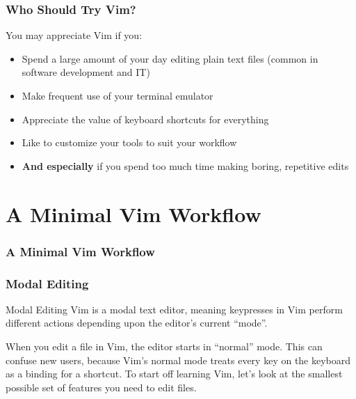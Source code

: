 \documentclass{beamer}
\begin{document}
\begin{frame}
    \frametitle{Who Should Try Vim?}
    \centerline{\large You may appreciate Vim if you:}
    \vspace{0.5cm}
    \begin{itemize}
	\item Spend a large amount of your day editing plain text files (common in software development and IT)
	\item Make frequent use of your terminal emulator
	\item Appreciate the value of keyboard shortcuts for everything
	\item Like to customize your tools to suit your workflow
	\item \textbf{And especially} if you spend too much time making boring, repetitive edits
    \end{itemize}
\end{frame}

\section{A Minimal Vim Workflow}

\begin{frame}
    \frametitle{A Minimal Vim Workflow}
    \tableofcontents[currentsection]
\end{frame}

\begin{frame}[fragile]
    \frametitle{Modal Editing}
    \small
    \begin{block}{Modal Editing}
	Vim is a modal text editor, meaning keypresses in Vim perform different actions depending upon the editor's current \enquote{mode}.\\
    \end{block}
    When you edit a file in Vim, the editor starts in \enquote{normal} mode. This can confuse new users, because Vim's normal mode treats every key on the keyboard as a binding for a shortcut. To start off learning Vim, let's look at the smallest possible set of features you need to edit files.
\end{frame}
\end{document}
